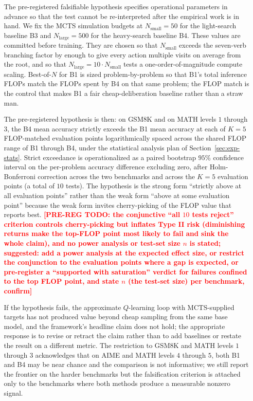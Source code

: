 The pre-registered falsifiable hypothesis specifies operational
parameters in advance so that the test cannot be re-interpreted after
the empirical work is in hand. We fix the MCTS simulation budgets at
$N_{\mathrm{small}} = 50$ for the light-search baseline B3 and
$N_{\mathrm{large}} = 500$ for the heavy-search baseline B4. These
values are committed before training. They are chosen so that
$N_{\mathrm{small}}$ exceeds the seven-verb branching factor by enough
to give every action multiple visits on average from the root, and so
that $N_{\mathrm{large}} = 10 \cdot N_{\mathrm{small}}$ tests a
one-order-of-magnitude compute scaling. Best-of-$N$ for B1 is sized
problem-by-problem so that B1's total inference FLOPs match the FLOPs
spent by B4 on that same problem; the FLOP match is the
control that makes B1 a fair cheap-deliberation baseline rather than a
straw man.

The pre-registered hypothesis is then: on GSM8K and on MATH levels $1$
through $3$, the B4 mean accuracy strictly exceeds the B1 mean accuracy
at each of $K = 5$ FLOP-matched evaluation points logarithmically
spaced across the shared FLOP range of B1 through B4, under the
statistical analysis plan of Section~\ref{sec:exp-stats}. Strict
exceedance is operationalized as a paired bootstrap $95\%$ confidence
interval on the per-problem accuracy difference excluding zero, after
Holm-Bonferroni correction across the two benchmarks and across the
$K = 5$ evaluation points (a total of $10$ tests). The hypothesis is
the strong form ``strictly above at all evaluation points'' rather
than the weak form ``above at some evaluation point'' because the weak
form invites cherry-picking of the FLOP value that reports best.
\textcolor{red}{\textbf{[PRE-REG TODO: the conjunctive ``all $10$ tests
reject'' criterion controls cherry-picking but inflates Type II risk
(diminishing returns make the top-FLOP point most likely to fail and
sink the whole claim), and no power analysis or test-set size $n$ is
stated; suggested: add a power analysis at the expected effect size, or
restrict the conjunction to the evaluation points where a gap is
expected, or pre-register a ``supported with saturation'' verdict for
failures confined to the top FLOP point, and state $n$ (the test-set
size) per benchmark, confirm]}}

If the hypothesis fails, the approximate $Q$-learning loop with
MCTS-supplied targets has not produced value beyond cheap sampling
from the same base model, and the framework's headline claim does not
hold; the appropriate response is to revise or retract the claim
rather than to add baselines or restate the result on a different
metric. The restriction to GSM8K and MATH levels $1$ through $3$
acknowledges that on AIME and MATH levels $4$ through $5$, both B1
and B4 may be near chance and the comparison is not informative; we
still report the frontier on the harder benchmarks but the
falsification criterion is attached only to the benchmarks where both
methods produce a measurable nonzero signal.

